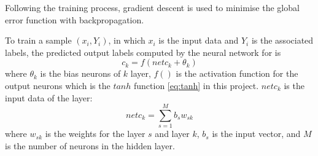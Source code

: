 Following the training process, gradient descent is used to minimise the global error function with backpropagation. 

To train a sample $(x_{i}, Y_{i})$, in which $x_{i}$ is the input data and $Y_{i}$ is the associated labels, the predicted output labels computed by the neural network for is
\begin{equation}\label{eq:MultiLabelActivation}
c_{k} = f(netc_{k} + \theta_{k})
\end{equation}
where $\theta_{k}$ is the bias neurons of $k$ layer, $f()$ is the activation function for the output neurons which is the $tanh$ function \ref{eq:tanh} in this project. $netc_{k}$ is the input data of the layer:
\begin{equation}\label{eq:MultiLabel}
netc_{k} = \sum_{s=1}^M b_{s}w_{sk}
\end{equation}
where $w_{sk}$ is the weights for the layer $s$ and layer $k$, $b_{s}$ is the input vector, and $M$ is the number of neurons in the hidden layer.


